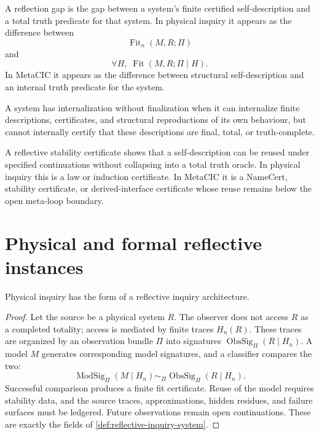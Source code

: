 \begin{definition}
\label{def:reflection-gap}
A reflection gap is the gap between a system's finite certified self-description and a total truth predicate for that system. In physical inquiry it appears as the difference between
$$
\operatorname{Fit}_n(M,R;\Pi)
$$
and
$$
\forall H,\;
\operatorname{Fit}(M,R;\Pi\mid H).
$$
In MetaCIC it appears as the difference between structural self-description and an internal truth predicate for the system.
\end{definition}

\begin{definition}
\label{def:internalization-without-finalization}
A system has internalization without finalization when it can internalize finite descriptions, certificates, and structural reproductions of its own behaviour, but cannot internally certify that these descriptions are final, total, or truth-complete.
\end{definition}

\begin{definition}
\label{def:reflective-stability-certificate}
A reflective stability certificate shows that a self-description can be reused under specified continuations without collapsing into a total truth oracle. In physical inquiry this is a law or induction certificate. In MetaCIC it is a NameCert, stability certificate, or derived-interface certificate whose reuse remains below the open meta-loop boundary.
\end{definition}

\section{Physical and formal reflective instances}
\label{sec:physical-formal-reflective-instances}

\begin{theorem}
\label{thm:physical-inquiry-instantiates-reflective-architecture}
Physical inquiry has the form of a reflective inquiry architecture.
\end{theorem}

\begin{proof}
Let the source be a physical system $R$. The observer does not access $R$ as a completed totality; access is mediated by finite traces $H_n(R)$. These traces are organized by an observation bundle $\Pi$ into signatures $\operatorname{ObsSig}_{\Pi}(R\mid H_n)$. A model $M$ generates corresponding model signatures, and a classifier compares the two:
$$
\operatorname{ModSig}_{\Pi}(M\mid H_n)
\sim_{\Pi}
\operatorname{ObsSig}_{\Pi}(R\mid H_n).
$$
Successful comparison produces a finite fit certificate. Reuse of the model requires stability data, and the source traces, approximations, hidden residues, and failure surfaces must be ledgered. Future observations remain open continuations. These are exactly the fields of \autoref{def:reflective-inquiry-system}.
\end{proof}

